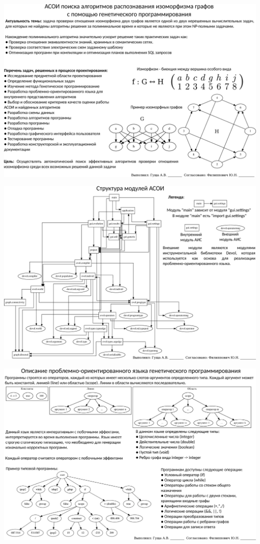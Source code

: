 \documentclass[russian,utf8, a1paper]{eskdgraph}
\begin{document}
\begin{ESKDdrawing}

\includegraphics[scale=1.0]{list1}

\end{ESKDdrawing}

\begin{ESKDdrawing}
\includegraphics[scale=1.0]{list2}
\end{ESKDdrawing}

\begin{ESKDdrawing}
\includegraphics[scale=1.0]{list3}
\end{ESKDdrawing}
\end{document}
